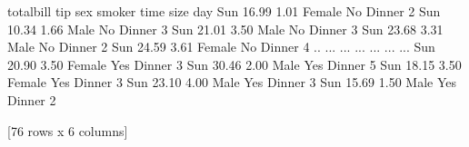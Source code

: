 \documentclass[letterpaper,10pt,english]{jupyterBook}
\begin{document}
\begin{sphinxVerbatim}[commandchars=\\\{\}]
  
\end{sphinxVerbatim}

\begin{sphinxVerbatim}[commandchars=\\\{\}]
\PYG{p}{[}\PYG{p}{]}
\end{sphinxVerbatim}

\begin{sphinxVerbatim}[commandchars=\\\{\}]
     total\PYGZus{}bill   tip     sex smoker    time  size
day                                               
Sun       16.99  1.01  Female     No  Dinner     2
Sun       10.34  1.66    Male     No  Dinner     3
Sun       21.01  3.50    Male     No  Dinner     3
Sun       23.68  3.31    Male     No  Dinner     2
Sun       24.59  3.61  Female     No  Dinner     4
..          ...   ...     ...    ...     ...   ...
Sun       20.90  3.50  Female    Yes  Dinner     3
Sun       30.46  2.00    Male    Yes  Dinner     5
Sun       18.15  3.50  Female    Yes  Dinner     3
Sun       23.10  4.00    Male    Yes  Dinner     3
Sun       15.69  1.50    Male    Yes  Dinner     2

[76 rows x 6 columns]
\end{sphinxVerbatim}

\begin{sphinxVerbatim}[commandchars=\\\{\}]
  \PYG{p}{[}\PYG{p}{]}
\end{sphinxVerbatim}

\begin{sphinxVerbatim}[commandchars=\\\{\}]
\PYG{p}{[}\PYG{p}{]}
\end{sphinxVerbatim}
\end{document}
